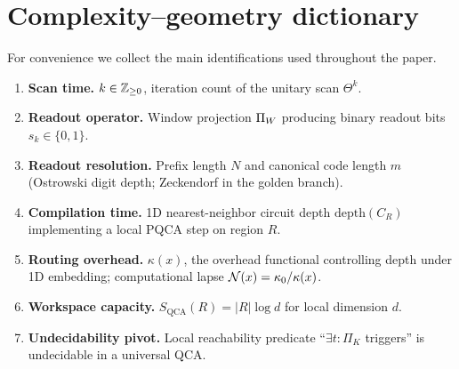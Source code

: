 \section{Complexity--geometry dictionary}
\label{app:dictionary}

For convenience we collect the main identifications used throughout the paper.

\begin{enumerate}
    \item \textbf{Scan time.} $k\in\mathbb{Z}_{\ge 0}$, iteration count of the unitary scan $\Theta^k$.
    \item \textbf{Readout operator.} Window projection $\Pi_W$ producing binary readout bits $s_k\in\{0,1\}$.
    \item \textbf{Readout resolution.} Prefix length $N$ and canonical code length $m$ (Ostrowski digit depth; Zeckendorf in the golden branch).
    \item \textbf{Compilation time.} 1D nearest-neighbor circuit depth $\mathrm{depth}(C_R)$ implementing a local PQCA step on region $R$.
    \item \textbf{Routing overhead.} $\kappa(x)$, the overhead functional controlling depth under 1D embedding; computational lapse $\mathcal{N}(x)=\kappa_0/\kappa(x)$.
    \item \textbf{Workspace capacity.} $S_{\mathrm{QCA}}(R)=|R|\log d$ for local dimension $d$.
    \item \textbf{Undecidability pivot.} Local reachability predicate ``$\exists t:\Pi_K$ triggers'' is undecidable in a universal QCA.
\end{enumerate}
